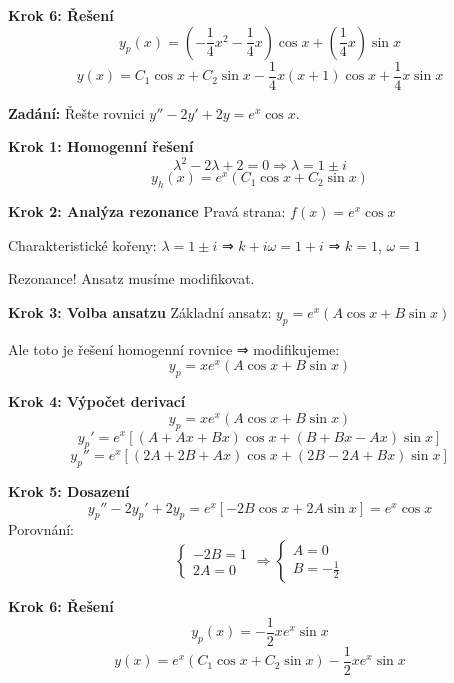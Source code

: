 \begin{example}
\vspace{1\baselineskip}

\noindent\textbf{Krok 6: Řešení}
\[
y_p(x) = \left(-\frac{1}{4}x^2 - \frac{1}{4}x\right)\cos x + \left(\frac{1}{4}x\right)\sin x
\]
\[
y(x) = C_1 \cos x + C_2 \sin x - \frac{1}{4}x(x + 1)\cos x + \frac{1}{4}x\sin x
\]

\end{example}

\begin{example}
\label{ex:exp-goniom-ansatz}

\noindent\textbf{Zadání:} Řešte rovnici $y'' - 2y' + 2y = e^{x}\cos x$.

\vspace{1.5\baselineskip}

\noindent\textbf{Krok 1: Homogenní řešení}
\[
\lambda^2 - 2\lambda + 2 = 0 \Rightarrow \lambda = 1 \pm i
\]
\[
y_h(x) = e^{x}(C_1 \cos x + C_2 \sin x)
\]

\vspace{1\baselineskip}

\noindent\textbf{Krok 2: Analýza rezonance}
Pravá strana: $f(x) = e^{x}\cos x$

Charakteristické kořeny: $\lambda = 1 \pm i$ ⇒ $k + i\omega = 1 + i$ ⇒ $k = 1$, $\omega = 1$

Rezonance! Ansatz musíme modifikovat.

\vspace{1\baselineskip}

\noindent\textbf{Krok 3: Volba ansatzu}
Základní ansatz: $y_p = e^{x}(A\cos x + B\sin x)$

Ale toto je řešení homogenní rovnice ⇒ modifikujeme:
\[
y_p = xe^{x}(A\cos x + B\sin x)
\]

\vspace{1\baselineskip}

\noindent\textbf{Krok 4: Výpočet derivací}
\[
y_p = xe^{x}(A\cos x + B\sin x)
\]
\[
y_p' = e^{x}[(A + Ax + Bx)\cos x + (B + Bx - Ax)\sin x]
\]
\[
y_p'' = e^{x}[(2A + 2B + Ax)\cos x + (2B - 2A + Bx)\sin x]
\]

\vspace{1\baselineskip}

\noindent\textbf{Krok 5: Dosazení}
\[
y_p'' - 2y_p' + 2y_p = e^{x}[-2B\cos x + 2A\sin x] = e^{x}\cos x
\]
Porovnání:
\[
\begin{cases}
-2B = 1 \\
2A = 0
\end{cases}
\Rightarrow
\begin{cases}
A = 0 \\
B = -\frac{1}{2}
\end{cases}
\]

\vspace{1\baselineskip}

\noindent\textbf{Krok 6: Řešení}
\[
y_p(x) = -\frac{1}{2}xe^{x}\sin x
\]
\[
y(x) = e^{x}(C_1 \cos x + C_2 \sin x) - \frac{1}{2}xe^{x}\sin x
\]

\end{example}

